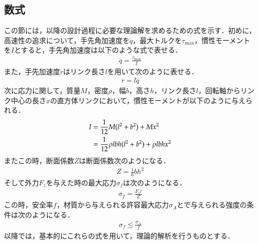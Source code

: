 \documentclass[10pt,b5paper,papersize,dvipdfmx]{jsbook}
\begin{document}
\subsection{数式}\label{数式}
この節には，以降の設計過程に必要な理論解を求めるための式を示す．初めに，高速性の追求について，手先角加速度を$\ddot{q}$，最大トルクを$\tau_{\mathrm{max}}$，慣性モーメントを$I$とすると，手先角加速度は以下のような式で表せる．
\begin{align}
\ddot{q}=\frac{\tau_{\mathrm{max}}}{I}
\end{align}
また，手先加速度$\ddot{r}$はリンク長さ$l$を用いて次のように表せる．
\begin{align}
\ddot{r}=l\ddot{q}
\end{align}
次に応力に関して，質量$M$，密度$\rho$，幅$b$，高さ$h$，リンク長さ$l$，回転軸からリンク中心の長さ$x$の直方体リンクにおいて，慣性モーメントが以下のように与えられる．
\begin{align}
  I &= \frac{1}{12}M(l^2+b^2)+Mx^2 \notag\\
    &= \frac{1}{12} \rho lbh(l^2+b^2 )+\rho lbhx^2
\end{align}
またこの時，断面係数$Z$は断面係数次のようになる．
\begin{align}
  Z=\frac{1}{6}bh^2
\end{align}
そして外力$F_z$を与えた時の最大応力$\sigma_f$は次のようになる．
\begin{align}
  \sigma_f=\frac{F_zl}{Z}
\end{align}
この時，安全率$f$，材質から与えられる許容最大応力$\sigma_A$とで与えられる強度の条件は次のようになる．
\begin{align}
  \sigma_f\leq\frac{\sigma_A}{f}
\end{align}
以降では，基本的にこれらの式を用いて，理論的解析を行うものとする．

\clearpage %
\end{document}
